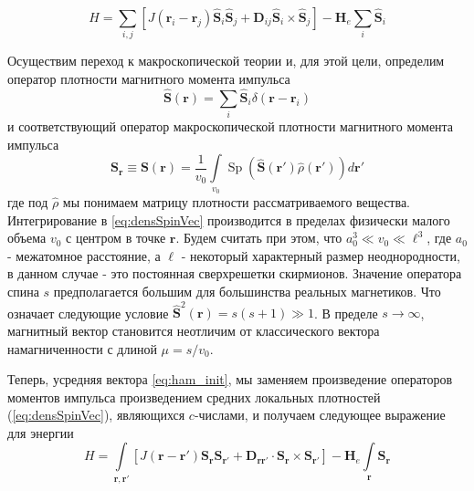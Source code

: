 \documentclass[a4paper,article,14pt]{extarticle}
\DeclareMathOperator{\Sp}{Sp}
\begin{document}
\begin{equation}
\label{eq:ham_init}	
H = \sum\limits_{i,j} {\left[ {J\left( {{{\mathbf{r}}_i} - {{\mathbf{r}}_j}} \right){{\widehat {\mathbf{S}}}_i}{{\widehat {\mathbf{S}}}_j} + {{\mathbf{D}}_{ij}}  {{\widehat {\mathbf{S}}}_i} \times {{\widehat {\mathbf{S}}}_j}} \right] - \mathbf{H}_e} \sum\limits_{i} {{{\widehat {\mathbf{S}}}_i}}
\end{equation}

Осуществим переход к макроскопической теории и, для этой цели, определим оператор плотности магнитного момента импульса
\begin{equation}
\label{eq:densSpinOperator}	
{\widehat {\mathbf{S}}} (\mathbf{r}) = \sum_i {{\widehat {\mathbf{S}}}_i} \delta (\mathbf{r} - \mathbf{r}_i)
\end{equation}
и соответствующий оператор макроскопической плотности магнитного момента импульса
\begin{equation}
\label{eq:densSpinVec}	
{\mathbf{S}}_\mathbf{r} \equiv {\mathbf{S}} (\mathbf{r}) = \frac{1}{v_0} \int\limits_{v_0} {\Sp{\left( {\widehat {\mathbf{S}}} (\mathbf{r'}) {\widehat \rho  } (\mathbf{r'}) \right)} d \mathbf{r'} }
\end{equation}
где под ${ \widehat \rho }$ мы понимаем матрицу плотности рассматриваемого вещества. Интегрирование в \eqref{eq:densSpinVec} производится в пределах физически малого объема $v_0$ с центром в точке $\mathbf{r}$. Будем считать при этом, что $a_0^3  \ll v_0 \ll \ell^3 $, где $a_0$ - межатомное расстояние, а $\ell$ - некоторый характерный размер неоднородности, в данном случае - это постоянная сверхрешетки скирмионов. Значение оператора спина $s$ предполагается большим для большинства реальных магнетиков. Что означает следующие условие $\widehat{\mathbf{S}}^{2}({\mathbf{r}}) = s(s+1) \gg 1$. В пределе $s\to \infty$, магнитный вектор становится неотличим от классического вектора намагниченности с длиной $\mu = s/v_{0}$.


Теперь, усредняя вектора \eqref{eq:ham_init}, мы заменяем произведение операторов моментов импульса произведением средних локальных плотностей (\ref{eq:densSpinVec}), являющихся $c$-числами, и получаем следующее выражение для энергии
\begin{equation}
\label{eq:ham}	
H = \int\limits_{\mathbf{r}, \mathbf{r}'} \left[ J\left( \mathbf{r} - \mathbf{r}' \right)\mathbf{S}_{\mathbf{r}} \mathbf{S}_{\mathbf{r}'} + {{\mathbf{D}}_{\mathbf{r} \mathbf{r}'}} \cdot \mathbf{S}_{\mathbf{r}} \times \mathbf{S}_{\mathbf{r}'} \right] -  \mathbf{H}_e  \int\limits_{\mathbf{r}}\mathbf{S}_{\mathbf{r}}
\end{equation}
\end{document}
